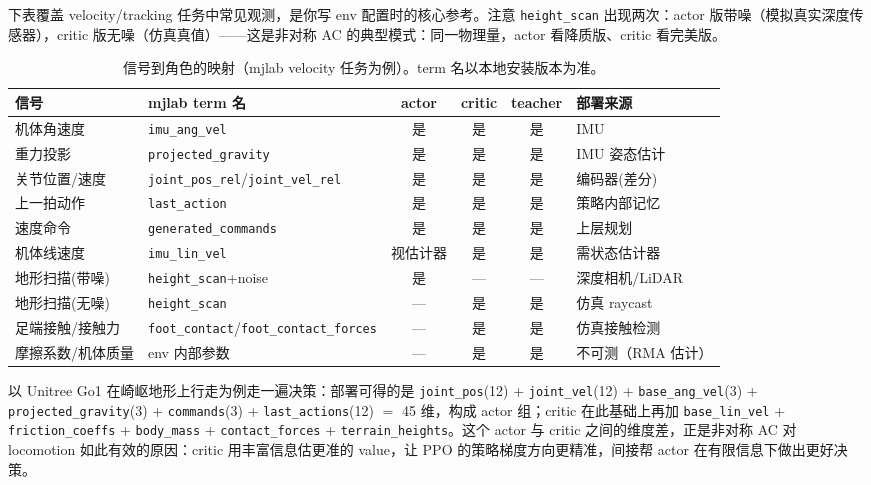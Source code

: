 下表覆盖 velocity/tracking 任务中常见观测，是你写 env 配置时的核心参考。注意 \verb|height_scan| 出现两次：actor 版带噪（模拟真实深度传感器），critic 版无噪（仿真真值）——这是非对称 AC 的典型模式：同一物理量，actor 看降质版、critic 看完美版。

\begin{table}[H]
\centering
\small
\caption{信号到角色的映射（mjlab velocity 任务为例）。term 名以本地安装版本为准。}
\label{tab:rlmc-priv-mapping}
\begin{tabular}{@{}p{2.7cm}p{3.0cm}cccp{2.6cm}@{}}
\toprule
信号 & mjlab term 名 & actor & critic & teacher & 部署来源 \\
\midrule
机体角速度 & \texttt{imu\_ang\_vel} & 是 & 是 & 是 & IMU \\
重力投影 & \texttt{projected\_gravity} & 是 & 是 & 是 & IMU 姿态估计 \\
关节位置/速度 & \texttt{joint\_pos\_rel}/\texttt{joint\_vel\_rel} & 是 & 是 & 是 & 编码器(差分) \\
上一拍动作 & \texttt{last\_action} & 是 & 是 & 是 & 策略内部记忆 \\
速度命令 & \texttt{generated\_commands} & 是 & 是 & 是 & 上层规划 \\
机体线速度 & \texttt{imu\_lin\_vel} & 视估计器 & 是 & 是 & 需状态估计器 \\
地形扫描(带噪) & \texttt{height\_scan}+noise & 是 & --- & --- & 深度相机/LiDAR \\
地形扫描(无噪) & \texttt{height\_scan} & --- & 是 & 是 & 仿真 raycast \\
足端接触/接触力 & \texttt{foot\_contact}/\texttt{foot\_contact\_forces} & --- & 是 & 是 & 仿真接触检测 \\
摩擦系数/机体质量 & env 内部参数 & --- & 是 & 是 & 不可测（RMA 估计） \\
\bottomrule
\end{tabular}
\end{table}

以 Unitree Go1 在崎岖地形上行走为例走一遍决策：部署可得的是 \verb|joint_pos|(12) + \verb|joint_vel|(12) + \verb|base_ang_vel|(3) + \verb|projected_gravity|(3) + \verb|commands|(3) + \verb|last_actions|(12) $=$ 45 维，构成 actor 组；critic 在此基础上再加 \verb|base_lin_vel| + \verb|friction_coeffs| + \verb|body_mass| + \verb|contact_forces| + \verb|terrain_heights|。这个 actor 与 critic 之间的维度差，正是非对称 AC 对 locomotion 如此有效的原因：critic 用丰富信息估更准的 value，让 PPO 的策略梯度方向更精准，间接帮 actor 在有限信息下做出更好决策。

